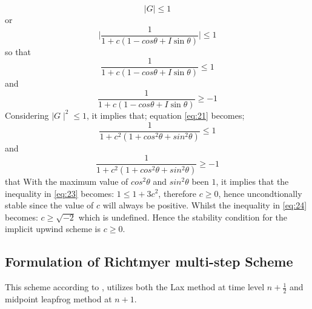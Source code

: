 \begin{equation*} \mid G \mid \leq 1 \end{equation*}  or  \begin{equation*} \mid \frac{1}{1 + c(1 - cos \theta + I\sin \theta)} \mid \leq 1  \end{equation*}
so that 
\begin{equation} \frac{1}{1 + c(1 - cos \theta + I\sin \theta)} \leq 1 \label{eq:21}
\end{equation}
and
\begin{equation} \frac{1}{1 + c(1 - cos \theta + I\sin \theta)} \geq -1 \label{eq:22}
\end{equation}
Considering $ \mid G \mid^{2} \leq 1$, it implies that; equation \eqref{eq:21} becomes;
\begin{equation} \frac{1}{1 + c^{2}(1 + cos^{2} \theta + sin^{2} \theta)} \leq 1 \label{eq:23}
\end{equation}
and
\begin{equation} \frac{1}{1 + c^{2}(1 + cos^{2} \theta + sin^{2} \theta)} \geq -1 \label{eq:24}
\end{equation}
 that With the maximum value of $ cos^{2} \theta$ and $sin^{2} \theta$ been $1$, it implies that the inequality in \eqref{eq:23} becomes: $1 \leq 1 + 3c^2$, therefore $c \geq 0$, hence uncondtionally stable since the value of $c$ will always be positive. Whilst the inequality in \eqref{eq:24} becomes: $c \geq \sqrt{-2}$ which is undefined. Hence the stability condition for the implicit upwind scheme is $ \boxed{c \geq 0} $.

\subsection{Formulation of Richtmyer multi-step Scheme}
This scheme according to \cite{Hoffmann}, utilizes both the Lax method at time level $n+\frac{1}{2}$ and midpoint leapfrog method at $n+1$.

